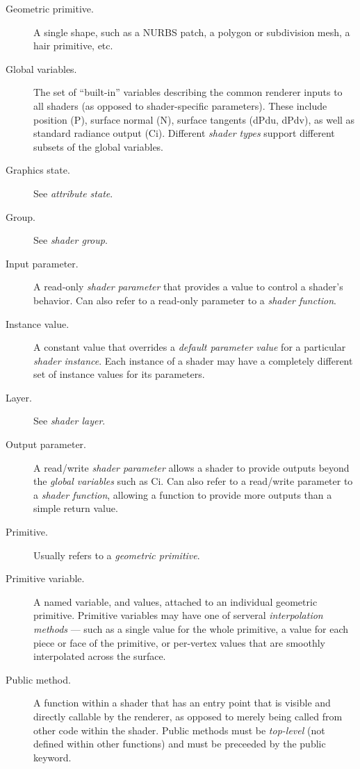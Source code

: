 \documentclass[11pt,letterpaper]{book}
\def\Ci{{\cf Ci}\xspace}
\def\N{{\cf N}\xspace}
\def\P{{\cf P}\xspace}
\def\dPdu{{\cf dPdu}\xspace}
\def\dPdv{{\cf dPdv}\xspace}
\begin{document}
\begin{appendix}
\begin{description}
\item[Geometric primitive.] A single shape, such as a NURBS patch, a
  polygon or subdivision mesh, a hair primitive, etc.

\item[Global variables.] The set of ``built-in'' variables describing the
  common renderer inputs to all shaders (as opposed to shader-specific
  parameters).  These include position (\P), surface normal (\N),
  surface tangents (\dPdu, \dPdv), as well as standard radiance output (\Ci).
  Different \emph{shader types} support
  different subsets of the global variables.

\item[Graphics state.] See \emph{attribute state}.

\item[Group.] See \emph{shader group}.

\item[Input parameter.] A read-only \emph{shader parameter} that provides
  a value to control a shader's behavior.  Can also refer to a read-only
  parameter to a \emph{shader function}.

\item[Instance value.] A constant value that overrides a \emph{default
  parameter value} for a particular \emph{shader instance}.  Each
  instance of a shader may have a completely different set of instance
  values for its parameters.

\item[Layer.] See \emph{shader layer}.

\item[Output parameter.] A read/write \emph{shader parameter} allows a
  shader to provide outputs beyond the \emph{global variables} such as
  \Ci.  Can also refer to a read/write parameter to a
  \emph{shader function}, allowing a function to provide more outputs
  than a simple return value.

\item[Primitive.] Usually refers to a \emph{geometric primitive}.

\item[Primitive variable.] A named variable, and values, attached to an
  individual geometric primitive.  Primitive variables may have one of
  serveral \emph{interpolation methods} --- such as a single value for
  the whole primitive, a value for each piece or face of the primitive,
  or per-vertex values that are smoothly interpolated across the
  surface.

\item[Public method.] A function within a shader that has an entry point
  that is visible and directly callable by the renderer, as opposed to
  merely being called from other code within the shader.  Public methods
  must be \emph{top-level} (not defined within other functions) and must
  be preceeded by the {\cf public} keyword.


\end{description}
\end{appendix}
\end{document}
